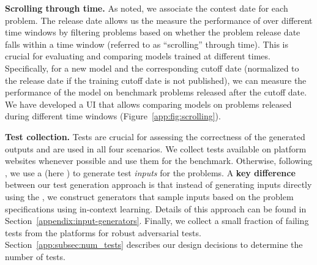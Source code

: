 \noindent \textbf{Scrolling through time.}
As noted, we associate the contest date \contestdate{} for each problem.
The release date allows us the measure the performance of \llms{} over different time windows by filtering problems 
based on whether the problem release date falls within a time window (referred to as ``scrolling'' through time).
This is crucial for evaluating and comparing models trained at different times. 
Specifically, for a new model and the corresponding cutoff date (normalized to the release date if the 
training cutoff date is not published), 
we can measure the performance of the model on benchmark problems released after the cutoff date.
We have developed a UI that allows comparing models on problems released during different time windows (Figure~\ref{app:fig:scrolling}).

\noindent \textbf{Test collection.}
Tests are crucial for assessing the correctness of the generated outputs and are used in all four scenarios.
We collect tests available on platform websites whenever possible and use them for the benchmark.
Otherwise, following \citep{liu2023your}, we use a \llm{} (here \gptfourturbo{}) to generate test \emph{inputs} for the problems.
A \textbf{key difference} between our test generation approach is that instead of generating inputs directly using the \llm{}, we construct generators that sample inputs based on the problem specifications using in-context learning.
Details of this approach can be found in Section~\ref{appendix:input-generators}.
Finally, we collect a small fraction of failing tests from the platforms for robust adversarial tests. Section~\ref{app:subsec:num_tests} describes our design decisions to determine the number of tests.

